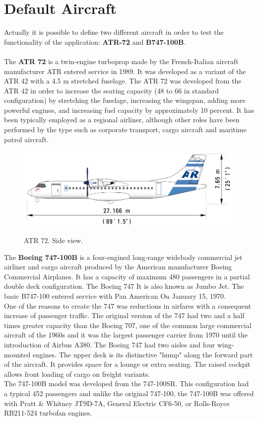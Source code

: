
\section {Default Aircraft}
Actually it is possible to define two different aircraft in order to test the functionality of the application: {\bfseries ATR-72}  and {\bfseries B747-100B}. \\ \\

The {\bfseries ATR 72} is a twin-engine turboprop made by the French-Italian aircraft manufacturer ATR entered service in 1989.  It was developed as a variant of the ATR 42  with a 4.5 m stretched fuselage.  The ATR 72 was developed from the ATR 42 in order to increase the seating capacity (48 to 66 in standard configuration) by stretching the fuselage, increasing the wingspan, adding more powerful engines, and increasing fuel capacity by approximately 10 percent.\cite{atr:atr} It has been typically employed as a regional airliner, although other roles have been performed by the type such as corporate transport, cargo aircraft and maritime patrol aircraft. \cite{wiki:atr}


\begin{figure}[H]
\centering
{\includegraphics[height=4cm]{Immagini/atr72mod.jpg}} 
\caption{ATR 72. Side view.}
\end{figure}


The {\bfseries Boeing 747-100B} is a four-engined long-range widebody commercial jet airliner and cargo aircraft  produced by the American manufacturer Boeing Commercial Airplanes. It has a capacity of maximum 480 passengers in a partial double deck configuration. The Boeing 747 It is also known as Jumbo Jet. The basic B747-100 entered service with Pan American On January 15, 1970.\\
One of the reasons to create the 747 was reductions in airfares with a consequent increase of passenger traffic\cite{wiki:boeing}. The original version of the 747 had two and a half times greater capacity than the Boeing 707, one of the common large commercial aircraft of the 1960s and it was the largest passenger carrier from 1970 until the introduction of Airbus A380.\cite{boeing:boeing}
The Boeing 747 had two aisles and four wing-mounted engines. The upper deck is its distinctive "hump" along the forward part of the aircraft. It provides space for a lounge or extra seating. The raised cockpit allows front loading of cargo on freight variants. \\
The 747-100B model was developed from the 747-100SR. This configuration had a typical 452 passengers and unlike the original 747-100, the 747-100B was offered with Pratt \& Whitney JT9D-7A, General Electric CF6-50, or Rolls-Royce RB211-524 turbofan engines.

